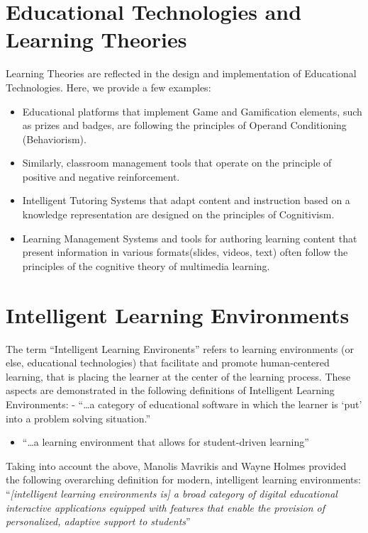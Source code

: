 \documentclass[
]{book}
\providecommand{\tightlist}{%
  \setlength{\itemsep}{0pt}\setlength{\parskip}{0pt}}
\begin{document}
\section{Educational Technologies and Learning Theories}\label{educational-technologies-and-learning-theories}

Learning Theories are reflected in the design and implementation of Educational Technologies. Here, we provide a few examples:

\begin{itemize}
\tightlist
\item
  Educational platforms that implement Game and Gamification elements, such as prizes and badges, are following the principles of Operand Conditioning (Behaviorism).
\item
  Similarly, classroom management tools that operate on the principle of positive and negative reinforcement.
\item
  Intelligent Tutoring Systems that adapt content and instruction based on a knowledge representation are designed on the principles of Cognitivism.
\item
  Learning Management Systems and tools for authoring learning content that present information in various formats(slides, videos, text) often follow the principles of the cognitive theory of multimedia learning.
\end{itemize}

\section{Intelligent Learning Environments}\label{intelligent-learning-environments}

The term ``Intelligent Learning Environents'' refers to learning environments (or else, educational technologies) that facilitate and promote human-centered learning, that is placing the learner at the center of the learning process. These aspects are demonstrated in the following definitions of Intelligent Learning Environments:
- ``\ldots a category of educational software in which the learner is `put' into a problem solving situation.'' \citep{dillenbourg1994intelligent}

\begin{itemize}
\tightlist
\item
  ``\ldots a learning environment that allows for student-driven learning'' \citep{kay1997learner}
\end{itemize}

Taking into account the above, Manolis Mavrikis and Wayne Holmes provided the following overarching definition for modern, intelligent learning environments:
``\emph{{[}intelligent learning environments is{]} a broad category of digital educational interactive applications equipped with features that enable the provision of personalized, adaptive support to students}'' \citep{mavrikis2019intelligent}
\end{document}
